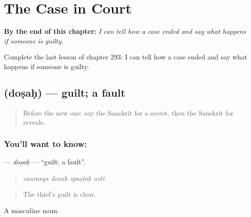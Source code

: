 
\chapter{The Case in Court}
\label{ch:sa-the-case-in-court}

\begin{chapteropening}
\textbf{By the end of this chapter:} \emph{I can tell how a case ended and say what happens if someone is guilty.}

Complete the last lesson of chapter 293: I can tell how a case ended and say what happens if someone is guilty.
\end{chapteropening}

\section[\texorpdfstring{\sk{दोषः} (doṣaḥ)}{दोषः (doṣaḥ)}]{ (doṣaḥ) — guilt; a fault}

\label{lesson:SA-C293-dosah}



\begin{quote}
Before the new one: say the Sanskrit for a secret, then the Sanskrit for reveals.
\end{quote}

\subsection*{You'll want to know: }
\textbf{} — \emph{doṣaḥ} — \textquotedblleft{}guilt; a fault\textquotedblright{}.

\begin{quote}
   
\end{quote}

\begin{quote}
\emph{caurasya doṣaḥ spaṣṭaḥ asti.}
\end{quote}

\begin{quote}
The thief's guilt is clear.
\end{quote}

A masculine noun.

